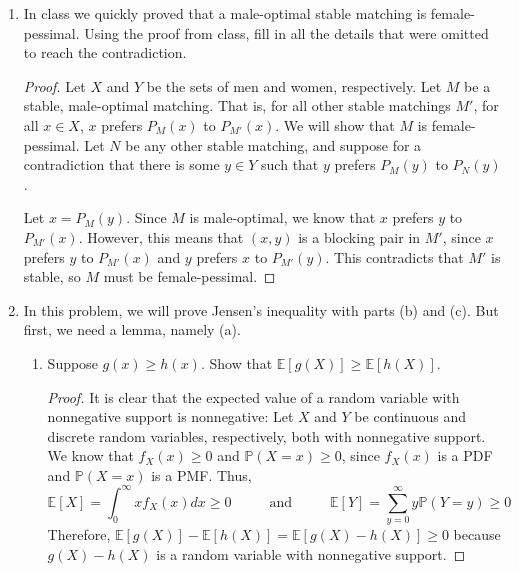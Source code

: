 \documentclass[10pt]{article}
\newcommand{\E}{\mathbb{E}}
\begin{document}
\begin{enumerate}
\begin{proof}
In this problem, it is possible for a woman to have \emph{single} at the very bottom of her list, yet still end up single.  This is strange, because it is not her fault at all that she is not getting matched (as it is for someone who truly refuses to be with certain men), but I guess that's just the way it goes sometimes.
\end{proof}

\item In class we quickly proved that a male-optimal stable matching is female-pessimal.  Using the proof from class, fill in all the details that were omitted to reach the contradiction.

\begin{proof}
Let $X$ and $Y$ be the sets of men and women, respectively.  Let $M$ be a stable, male-optimal matching.  That is, for all other stable matchings $M'$, for all $x \in X$, $x$ prefers $P_M(x)$ to $P_{M'}(x)$.  We will show that $M$ is female-pessimal.  Let $N$ be any other stable matching, and suppose for a contradiction that there is some $y \in Y$ such that $y$ prefers $P_M(y)$ to $P_{N}(y)$.

Let $x = P_M(y)$.  Since $M$ is male-optimal, we know that $x$ prefers $y$ to $P_{M'}(x)$.  However, this means that $(x,y)$ is a blocking pair in $M'$, since $x$ prefers $y$ to $P_{M'}(x)$ and $y$ prefers $x$ to $P_{M'}(y)$.  This contradicts that $M'$ is stable, so $M$ must be female-pessimal.
\end{proof}

\item In this problem, we will prove Jensen's inequality with parts (b) and (c).  But first, we need a lemma, namely (a).
\begin{enumerate}
\item Suppose $g(x) \geq h(x)$.  Show that $\mathbb{E}[g(X)] \geq \mathbb{E}[h(X)]$.

\begin{proof}
It is clear that the expected value of a random variable with nonnegative support is nonnegative:  Let $X$ and $Y$ be continuous and discrete random variables, respectively, both with nonnegative support.  We know that $f_X(x) \geq 0$ and $\mathbb{P}(X = x) \geq 0$, since $f_X(x)$ is a PDF and $\mathbb{P}(X = x)$ is a PMF.  Thus,
$$
\E[X] = \int_{0}^\infty x f_X(x) dx \geq 0
\hspace{1cm} \text{  and  } \hspace{1cm}
\E[Y] = \sum_{y = 0}^\infty y \mathbb{P}(Y = y) \geq 0
$$
Therefore, $\E[g(X)] - \E[h(X)] = \E[g(X) - h(X)] \geq 0$ because $g(X) - h(X)$ is a random variable with nonnegative support.
\end{proof}


\end{enumerate}
\end{enumerate}
\end{document}
